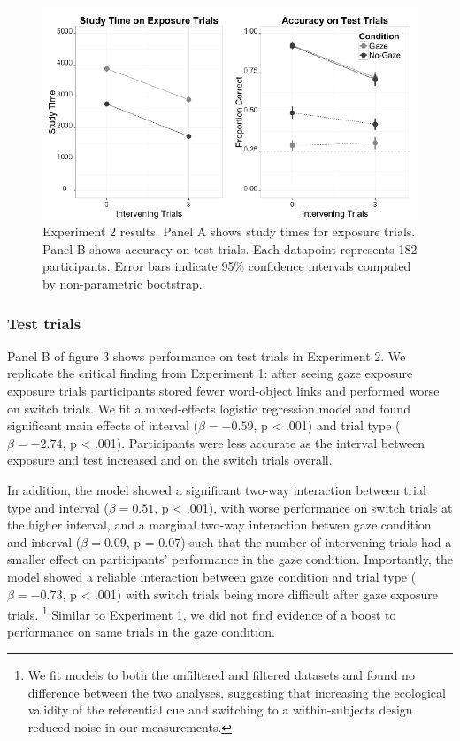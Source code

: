 \documentclass[12pt,]{article}
\let\rmarkdownfootnote\footnote%
\def\footnote{\protect\rmarkdownfootnote}
\begin{document}
\begin{figure}[htbp]
\centering
\includegraphics{figs/expt2 plot-1.pdf}
\caption{Experiment 2 results. Panel A shows study times for exposure
trials. Panel B shows accuracy on test trials. Each datapoint represents
182 participants. Error bars indicate 95\% confidence intervals computed
by non-parametric bootstrap.}
\end{figure}

\subsubsection{Test trials}\label{test-trials-1}

Panel B of figure 3 shows performance on test trials in Experiment 2. We
replicate the critical finding from Experiment 1: after seeing gaze
exposure exposure trials participants stored fewer word-object links and
performed worse on switch trials. We fit a mixed-effects logistic
regression model and found significant main effects of interval
(\(\beta = -0.59\), p \textless{} .001) and trial type
(\(\beta = -2.74\), p \textless{} .001). Participants were less accurate
as the interval between exposure and test increased and on the switch
trials overall.

In addition, the model showed a significant two-way interaction between
trial type and interval (\(\beta = 0.51\), p \textless{} .001), with
worse performance on switch trials at the higher interval, and a
marginal two-way interaction betwen gaze condition and interval
(\(\beta = 0.09\), p = 0.07) such that the number of intervening trials
had a smaller effect on participants' performance in the gaze condition.
Importantly, the model showed a reliable interaction between gaze
condition and trial type (\(\beta = -0.73\), p \textless{} .001) with
switch trials being more difficult after gaze exposure trials.
\footnote{We fit models to both the unfiltered and filtered datasets and found no difference between the two analyses, suggesting that increasing the ecological validity of the referential cue and switching to a within-subjects design reduced noise in our measurements.}
Similar to Experiment 1, we did not find evidence of a boost to
performance on same trials in the gaze condition.
\end{document}
